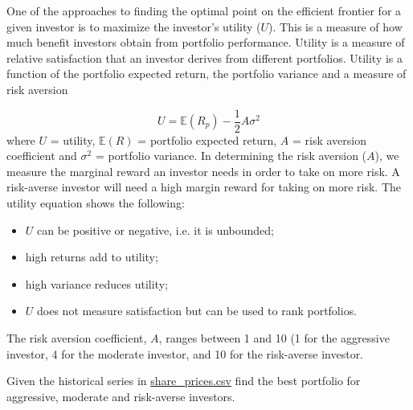 \begin{question}
One of the approaches to finding the optimal point on the efficient frontier for a given investor is to maximize the investor's utility ($U$). This is a measure of how much benefit investors obtain from portfolio performance. Utility is a measure of relative satisfaction that an investor derives from different portfolios. Utility is a function of the portfolio expected return, the portfolio variance and a measure of risk aversion

\begin{equation*}
U = \mathbb{E}(R_{p}) - \frac{1}{2}A\sigma^2
\end{equation*}
where $U$ = utility, $\mathbb{E}(R)$ = portfolio expected return, $A$ = risk aversion coefficient and $\sigma^2$ = portfolio variance.
In determining the risk aversion ($A$), we measure the marginal reward an investor needs in order to take on more risk. A risk-averse investor will need a high margin reward for taking on more risk. The utility equation shows the following:
\begin{itemize}
\tightlist
\item $U$ can be positive or negative, i.e. it is unbounded;
\item high returns add to utility;
\item high variance reduces utility;
\item $U$ does not measure satisfaction but can be used to rank portfolios.
\end{itemize}

The risk aversion coefficient, $A$, ranges between 1 and 10 (1 for the aggressive investor, 4 for the moderate investor, and 10 for the risk-averse investor.

Given the historical series in \href{https://github.com/matteosan1/finance_course/raw/master/input_files/share_price.csv}{share\_prices.csv} find the best portfolio for aggressive, moderate and risk-averse investors.

\end{question}


